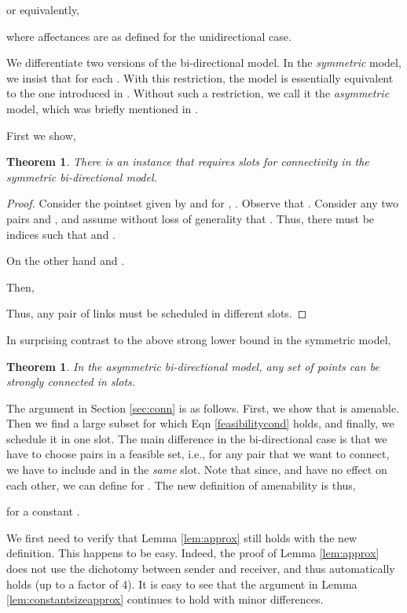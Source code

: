 \documentclass[11pt]{amsart}
\newcounter{foo}
\newtheorem{theorem}[foo]{Theorem}
\begin{document}
or equivalently,

where affectances are as defined for the unidirectional case.

We differentiate two versions of the bi-directional model. In the \emph{symmetric} model, we insist that 
for each . With this restriction, the model is essentially equivalent to the one
introduced in \cite{FKRV09}.
Without such a restriction,
we call it the \emph{asymmetric} model, which was briefly mentioned in \cite{KesselheimSoda11}.

First we show,
\begin{theorem}
There is an instance that 
requires  slots for connectivity in the symmetric bi-directional model.
\label{bidirlb}
\end{theorem}
\begin{proof}
Consider the pointset  given by
 and for , .
Observe that .
Consider any two pairs  and ,
and assume without loss of generality that .
Thus, there must be indices 
such that  and .

On the other hand  and .

Then,
 
Thus, any pair of links must be scheduled in different slots.
\end{proof}


In surprising contrast to the above strong lower bound in the symmetric model,
\begin{theorem}
In the asymmetric bi-directional model, any set of  points
can be strongly connected in  slots.
\end{theorem}

The argument in Section \ref{sec:conn} is as follows. First, we show that  is amenable. Then
we find a large subset for which Eqn \ref{feasibilitycond} holds, and finally, we schedule it in one slot.
The main difference in the bi-directional case is that we have to choose pairs in a feasible set, i.e., for any
pair  that we want to connect, we have to include  and  in the \emph{same} slot.
Note that since,  and  have no effect on each other, we can define  for
. The new definition of amenability is thus,


for a constant .

We first need to verify that Lemma \ref{lem:approx} still holds with the new definition. This happens to be easy. Indeed, the proof of Lemma \ref{lem:approx} does not use the dichotomy between sender and receiver, and thus automatically holds (up to a factor of 4). It is easy to see that the argument in Lemma \ref{lem:constantsizeapprox} continues to hold with minor differences.
\end{document}
